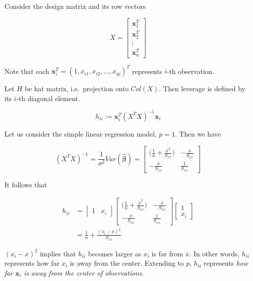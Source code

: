\documentclass[]{book}
\theoremstyle{definition}
\theoremstyle{definition}
\theoremstyle{definition}
\theoremstyle{remark}
\let\BeginKnitrBlock\begin \let\EndKnitrBlock\end
\begin{document}
Consider the design matrix and its row vectors

\[
X = \begin{bmatrix}
  \mathbf{x}_1^T \\
  \mathbf{x}_2^T \\
  \vdots \\
  \mathbf{x}_n^T
\end{bmatrix}
\]

Note that each \(\mathbf{x}_i^T = (1, x_{i1}, x_{i2}, \ldots, x_{ip})^T\) represents \(i\)-th observation.

\BeginKnitrBlock{definition}[Leverage]
\protect\hypertarget{def:hati}{}{\label{def:hati} {} }Let \(H\) be hat matrix, i.e.~projection onto \(Col(X)\). Then leverage is defined by its \(i\)-th diagonal element.

\[h_{ii} := \mathbf{x}_i^T (X^T X)^{-1} \mathbf{x}_i\]
\EndKnitrBlock{definition}

Let us consider the simple linear regression model, \(p = 1\). Then we have

\[
(X^T X)^{-1} = \frac{1}{\sigma^2} Var(\boldsymbol{\hat\beta}) = \begin{bmatrix}
  \bigg(\frac{1}{n} + \frac{\overline{x}^2}{S_{xx}}) & - \frac{\overline{x}}{S_{xx}} \\
  - \frac{\overline{x}}{S_{xx}} & \frac{1}{S_{xx}}
\end{bmatrix}
\]

It follows that

\begin{equation*}
  \begin{split}
    h_{ii} & = \begin{bmatrix}
      1 & x_i
    \end{bmatrix} \begin{bmatrix}
    \bigg(\frac{1}{n} + \frac{\overline{x}^2}{S_{xx}}) & - \frac{\overline{x}}{S_{xx}} \\
    - \frac{\overline{x}}{S_{xx}} & \frac{1}{S_{xx}}
  \end{bmatrix} \begin{bmatrix}
    1 \\
    x_i
  \end{bmatrix} \\
  & = \frac{1}{n} + \frac{(x_i - \overline{x})^2}{S_{xx}}
  \end{split}
\end{equation*}

\((x_i - \overline{x})^2\) implies that \(h_{ii}\) becomes larger as \(x_i\) is far from \(\overline{x}\). In other words, \(h_{ii}\) represents how far \(x_i\) is away from the center. Extending to \(p\), \(h_{ii}\) represents \emph{how far} \(\mathbf{x}_i\) \emph{is away from the center of observations}.
\end{document}
